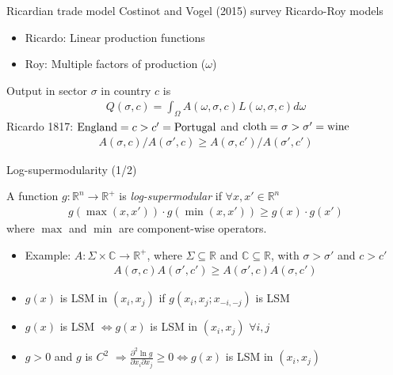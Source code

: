 \documentclass[10pt,notes=hide]{beamer}
\begin{document}
\begin{frame}{Ricardian trade model}
Costinot and Vogel (2015) survey Ricardo-Roy models
\begin{itemize}
	\item Ricardo: Linear production functions
	\item Roy: Multiple factors of production ($\omega$)
\end{itemize}
Output in sector $\sigma$ in country $c$ is
\begin{align*}
Q(\sigma,c)=\int_{\Omega} A(\omega,\sigma,c) L(\omega,\sigma,c)d\omega
\end{align*}
Ricardo 1817: $\textnormal{England}=c>c'=\textnormal{Portugal}$ and $\textnormal{cloth}=\sigma>\sigma'=\textnormal{wine}$
\begin{align*}
A(\sigma,c) / A(\sigma',c) \geq A(\sigma,c') / A(\sigma',c')
\end{align*}
\end{frame}
\begin{frame}{Log-supermodularity (1/2)}
\begin{definition}
A function $g:\mathbb{R}^n\to\mathbb{R}^{+}$ is \emph{log-supermodular} if $\forall x,x'\in\mathbb{R}^n$
\begin{align*}
g\left(\max\left(x,x'\right)\right)\cdot g\left(\min\left(x,x'\right)\right)\geq g(x)\cdot g(x')
\end{align*}
where $\max$ and $\min$ are component-wise operators.
\end{definition}
\begin{itemize}
	\item Example: $A: \Sigma\times\mathbb{C}\to\mathbb{R}^{+}$, where $\Sigma\subseteq\mathbb{R}$ and $\mathbb{C}\subseteq\mathbb{R}$, with $\sigma>\sigma'$ and $c>c'$
		\begin{align*}
		A(\sigma,c)A(\sigma',c')\geq A(\sigma',c)A(\sigma,c')
		\end{align*}
	\item $g(x)$ is LSM in $(x_i,x_j)$ if $g(x_i,x_j;x_{-i,-j})$ is LSM 
	\item $g(x)$ is LSM $\iff g(x)$ is LSM in $(x_i,x_j)$  $\forall i,j$
	\item $g>0$ and $g$ is $C^2$ $\Rightarrow \frac{\partial^2 \ln g}{\partial x_i \partial x_j}\geq 0 \iff g(x)$ is LSM in $(x_i,x_j)$
\end{itemize}
\end{frame}
\end{document}
